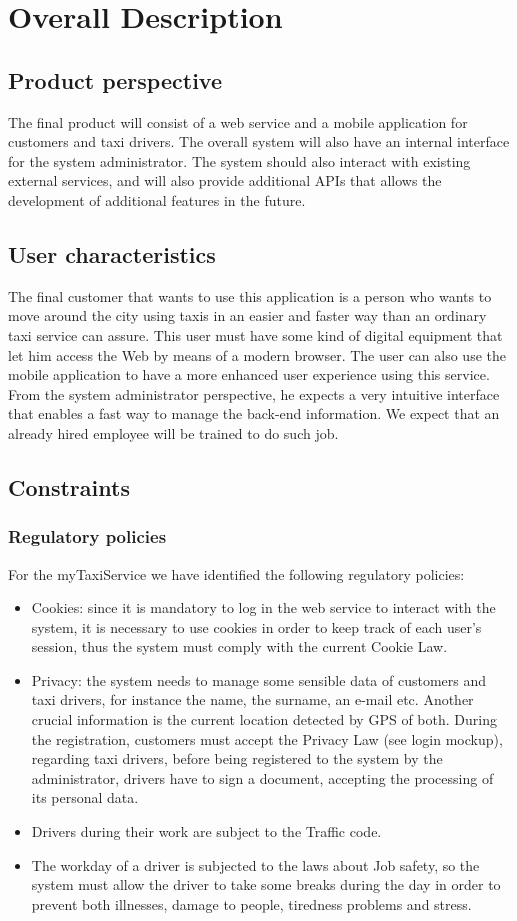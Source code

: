 \documentclass[a4paper,12pt]{article}%
\begin{document}
\section{Overall Description}
\subsection{Product perspective}
The final product will consist of a web service and a mobile application for customers and taxi drivers.
The overall system will also have an internal interface for the system administrator. The system should also interact with existing external services, and will also provide additional APIs that allows the development of additional features in the future. 
\subsection{User characteristics}
The final customer that wants to use this application is a person who wants to move around the city using taxis in an easier and faster way than an ordinary taxi service can assure. This user must have some kind of digital equipment that let him access the Web by means of a modern browser. The user can also use the mobile application to have a more enhanced user experience using this service.
From the system administrator perspective, he expects a very intuitive interface that enables a fast way to manage the back-end information. We expect that an already hired employee will be trained to do such job.
\subsection{Constraints}
\subsubsection{Regulatory policies}
For the myTaxiService we have identified the following regulatory policies:
\begin{itemize}
\item Cookies: since it is mandatory to log in the web service to interact with the system, it is necessary to use cookies in order to keep track of each user's session, thus the system must comply with the current Cookie Law.
\item Privacy: the system needs to manage some sensible data of customers and taxi drivers, for instance the name, the surname, an e-mail etc. Another crucial information is the current location detected by GPS of both. During the registration, customers must accept the Privacy Law (see login mockup), regarding taxi drivers, before being registered to the system by the administrator, drivers have to sign a document, accepting the processing of its personal data.
\item Drivers during their work are subject to the Traffic code.
\item The workday of a driver is subjected to the laws about Job safety, so the system must allow the driver to take some breaks during the day in order to prevent both illnesses, damage to people, tiredness problems and stress.
\end{itemize}
\end{document}

